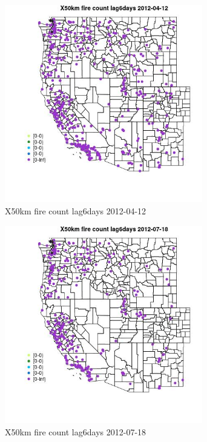 \begin{figure} 
\centering  
\includegraphics[width=0.77\textwidth]{Code_Outputs/Report_ML_input_PM25_Step4_part_e_de_duplicated_aves_compiled_2019-05-14wNAs_MapObsX50km_fire_count_lag6days2012-04-12.jpg} 
\caption{\label{fig:Report_ML_input_PM25_Step4_part_e_de_duplicated_aves_compiled_2019-05-14wNAsMapObsX50km_fire_count_lag6days2012-04-12}X50km fire count lag6days 2012-04-12} 
\end{figure} 
 

\begin{figure} 
\centering  
\includegraphics[width=0.77\textwidth]{Code_Outputs/Report_ML_input_PM25_Step4_part_e_de_duplicated_aves_compiled_2019-05-14wNAs_MapObsX50km_fire_count_lag6days2012-07-18.jpg} 
\caption{\label{fig:Report_ML_input_PM25_Step4_part_e_de_duplicated_aves_compiled_2019-05-14wNAsMapObsX50km_fire_count_lag6days2012-07-18}X50km fire count lag6days 2012-07-18} 
\end{figure} 
 


